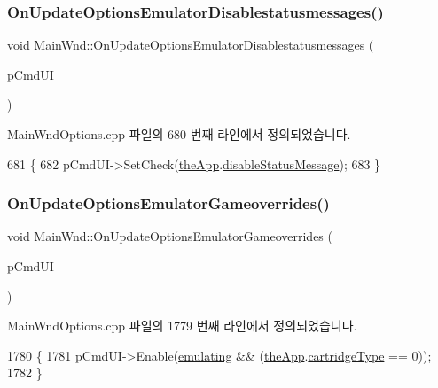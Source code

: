 \subsubsection{\texorpdfstring{On\+Update\+Options\+Emulator\+Disablestatusmessages()}{OnUpdateOptionsEmulatorDisablestatusmessages()}}
{\footnotesize\ttfamily void Main\+Wnd\+::\+On\+Update\+Options\+Emulator\+Disablestatusmessages (\begin{DoxyParamCaption}\item[{C\+Cmd\+UI $\ast$}]{p\+Cmd\+UI }\end{DoxyParamCaption})\hspace{0.3cm}{\ttfamily [protected]}}



Main\+Wnd\+Options.\+cpp 파일의 680 번째 라인에서 정의되었습니다.


\begin{DoxyCode}
681 \{
682   pCmdUI->SetCheck(\mbox{\hyperlink{_v_b_a_8cpp_a8095a9d06b37a7efe3723f3218ad8fb3}{theApp}}.\mbox{\hyperlink{class_v_b_a_a7bfea5ab60b19d26053b22ce070e2248}{disableStatusMessage}});
683 \}
\end{DoxyCode}
\mbox{\label{class_main_wnd_ae8b5a29533bf12488647e91737a775c0}} 
\subsubsection{\texorpdfstring{On\+Update\+Options\+Emulator\+Gameoverrides()}{OnUpdateOptionsEmulatorGameoverrides()}}
{\footnotesize\ttfamily void Main\+Wnd\+::\+On\+Update\+Options\+Emulator\+Gameoverrides (\begin{DoxyParamCaption}\item[{C\+Cmd\+UI $\ast$}]{p\+Cmd\+UI }\end{DoxyParamCaption})\hspace{0.3cm}{\ttfamily [protected]}}



Main\+Wnd\+Options.\+cpp 파일의 1779 번째 라인에서 정의되었습니다.


\begin{DoxyCode}
1780 \{
1781   pCmdUI->Enable(\mbox{\hyperlink{_main_wnd_options_8cpp_af9cc36078b1b311753963297ae7f2a74}{emulating}} && (\mbox{\hyperlink{_v_b_a_8cpp_a8095a9d06b37a7efe3723f3218ad8fb3}{theApp}}.\mbox{\hyperlink{class_v_b_a_af300759fcbc7eeb00ce73f956fc5ddb7}{cartridgeType}} == 0));
1782 \}
\end{DoxyCode}
\mbox{\label{class_main_wnd_a4f2fe44c9b633dd600d93fbb0b0e3840}} 

